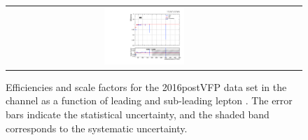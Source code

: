 \begin{figure}[htb]
\begin{center}
\begin{tabular}{ccc}
      \includegraphics[width=0.30\textwidth]{fig_2016postVFP_TrigSF/g_ee_lepBpt_FullSystUncBand.pdf}\\
    \end{tabular}
    \caption{Efficiencies and scale factors for the 2016postVFP data set in the \ee channel as a function of leading and sub-leading lepton \pT.
            The error bars indicate the statistical uncertainty, and the shaded band corresponds to the systematic uncertainty.
            }
    \label{TrigSF_2016postVFP_2}
  \end{center}
\end{figure}

